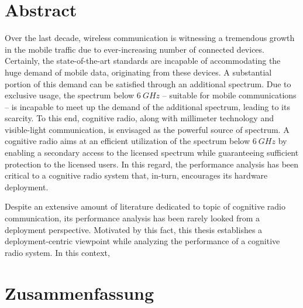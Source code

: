 
\chapter*{Abstract}
Over the last decade, wireless communication is witnessing a tremendous growth in the mobile traffic due to ever-increasing number of connected devices. Certainly, the state-of-the-art standards are incapable of accommodating the huge demand of mobile data, originating from these devices. A substantial portion of this demand can be satisfied through an additional spectrum. Due to exclusive usage, the spectrum below $\SI{6}{GHz}$ -- suitable for mobile communications -- is incapable to meet up the demand of the additional spectrum, leading to its scarcity. To this end, cognitive radio, along with millimeter technology and visible-light communication, is envisaged as the powerful source of spectrum. A cognitive radio aims at an efficient utilization of the spectrum below $\SI{6}{GHz}$ by enabling a secondary access to the licensed spectrum while guaranteeing sufficient protection to the licensed users. In this regard, the performance analysis has been critical to a cognitive radio system that, in-turn, encourages its hardware deployment. 


Despite an extensive amount of literature dedicated to topic of cognitive radio communication, its performance analysis has been rarely looked from a deployment perspective. Motivated by this fact, this thesis establishes a deployment-centric viewpoint while analyzing the performance of a cognitive radio system. In this context,  

\cleardoublepage
\chapter*{Zusammenfassung}


\cleardoublepage
